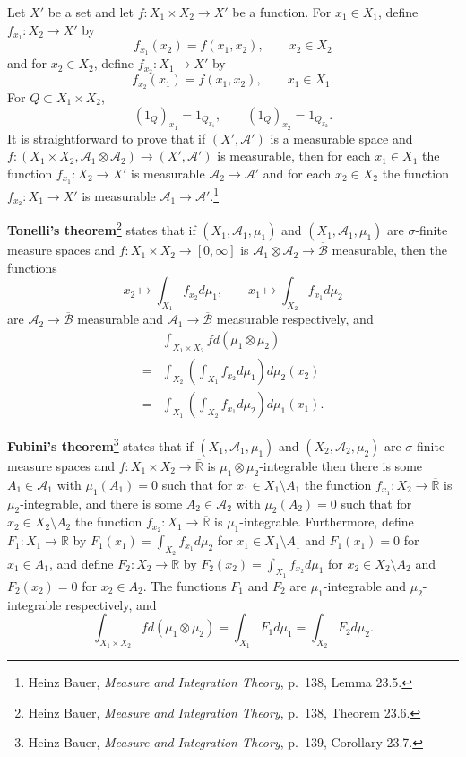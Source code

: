 \documentclass{article}
\theoremstyle{definition}
\begin{document}
Let $X'$ be a set and let $f:X_1 \times X_2 \to X'$ be a function. For $x_1 \in X_1$, define
$f_{x_1}:X_2 \to X'$ by
\[
f_{x_1}(x_2) = f(x_1,x_2),\qquad x_2 \in X_2
\]
and for $x_2 \in X_2$, define $f_{x_2}:X_1 \to X'$ by
\[
f_{x_2}(x_1) = f(x_1,x_2),\qquad x_1 \in X_1.
\]
For $Q \subset X_1 \times X_2$,
\[
(1_Q)_{x_1} = 1_{Q_{x_1}},\qquad (1_Q)_{x_2}=1_{Q_{x_2}}.
\]
It is straightforward to prove that if $(X',\mathscr{A}')$ is a measurable space and
$f:(X_1 \times X_2,\mathscr{A}_1 \otimes \mathscr{A}_2) \to (X',\mathscr{A}')$ is measurable,
then for each $x_1 \in X_1$ the function $f_{x_1}:X_2 \to X'$ is measurable
$\mathscr{A}_2 \to \mathscr{A}'$ and for each $x_2 \in X_2$ the function
$f_{x_2}:X_1 \to X'$ is measurable
$\mathscr{A}_1 \to \mathscr{A}'$.\footnote{Heinz Bauer,
{\em Measure and Integration Theory}, p.~138, Lemma 23.5.} 

\textbf{Tonelli's theorem}\footnote{Heinz Bauer,
{\em Measure and Integration Theory}, p.~138, Theorem 23.6.}  states that
if $(X_1,\mathscr{A}_1,\mu_1)$ and $(X_1,\mathscr{A}_1,\mu_1)$ are $\sigma$-finite measure spaces and
$f:X_1 \times X_2 \to [0,\infty]$ is $\mathscr{A}_1 \otimes \mathscr{A}_2 \to \overline{\mathscr{B}}$ measurable, then
the functions
\[
x_2 \mapsto \int_{X_1} f_{x_2} d\mu_1,\qquad x_1 \mapsto \int_{X_2} f_{x_1} d\mu_2
\]
are $\mathscr{A}_2 \to \overline{\mathscr{B}}$ measurable
and $\mathscr{A}_1 \to \overline{\mathscr{B}}$ measurable respectively, and
\begin{equation}
\begin{split}
&\int_{X_1 \times X_2} f d(\mu_1 \otimes \mu_2)\\
=& \int_{X_2} \left( \int_{X_1} f_{x_2} d\mu_1 \right) d\mu_2(x_2)\\
=&\int_{X_1} \left( \int_{X_2} f_{x_1} d\mu_2 \right) d\mu_1(x_1).
\end{split}
\label{tonelli}
\end{equation}

\textbf{Fubini's theorem}\footnote{Heinz Bauer,
{\em Measure and Integration Theory}, p.~139, Corollary 23.7.} states that if
$(X_1,\mathscr{A}_1,\mu_1)$ and $(X_2,\mathscr{A}_2,\mu_2)$ are $\sigma$-finite measure spaces
and $f:X_1 \times X_2 \to \overline{\mathbb{R}}$ is $\mu_1 \otimes \mu_2$-integrable then
there is some $A_1 \in \mathscr{A}_1$ with $\mu_1(A_1)=0$ such that
for $x_1 \in X_1 \setminus A_1$ the function $f_{x_1}:X_2 \to \overline{\mathbb{R}}$ is $\mu_2$-integrable,
and there is some $A_2 \in \mathscr{A}_2$ with $\mu_2(A_2)=0$ such that for $x_2 \in X_2 \setminus A_2$ the function
$f_{x_2}:X_1 \to \overline{\mathbb{R}}$ is $\mu_1$-integrable. Furthermore, define
$F_1:X_1 \to \mathbb{R}$ by $F_1(x_1) = \int_{X_2} f_{x_1} d\mu_2$ for $x_1 \in X_1 \setminus A_1$ and $F_1(x_1)=0$ for $x_1 \in A_1$,
and define $F_2:X_2 \to \mathbb{R}$ by $F_2(x_2) = \int_{X_1} f_{x_2} d\mu_1$ for $x_2 \in X_2 \setminus A_2$ and $F_2(x_2)=0$ for $x_2 \in A_2$.
The functions $F_1$ and $F_2$ are $\mu_1$-integrable and $\mu_2$-integrable respectively, and 
\[
\int_{X_1 \times X_2} f d(\mu_1 \otimes \mu_2) = \int_{X_1} F_1 d\mu_1 = \int_{X_2} F_2 d\mu_2.
\]
\end{document}
